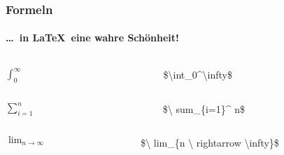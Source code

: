 
\begin{frame}
\frametitle{Formeln}
\framesubtitle{\ldots ~in \LaTeX ~eine wahre Sch\"onheit!}
\begin{columns}
\begin{column}{.4\textwidth}
\flushright
$\int_0^\infty$
\end{column}
\begin{column}{.6\textwidth}
\flushleft
{\ttfamily\color{unibayellowI}\$\color{nounibaredI}\textbackslash\color{nounibaredI}int\_\color{black}0\color{nounibaredI}\textasciicircum \textbackslash infty\color{unibayellowI}\$}
\end{column}
\end{columns}
\begin{columns}
\begin{column}{.4\textwidth}
\flushright
$\sum_{i=1}^n$
\end{column}
\begin{column}{.6\textwidth}
\flushleft
{\ttfamily \color{unibayellowI}\$\color{nounibaredI}\textbackslash
\color{nounibaredI}sum\_\color{black}\{i=1\}\color{nounibaredI}\textasciicircum
\color{black}n\color{unibayellowI}\$}
\end{column}
\end{columns}

\begin{columns}
\begin{column}{.4\textwidth}
\flushright
$\lim_{n \rightarrow \infty}$
\end{column}
\begin{column}{.6\textwidth}
\flushleft
{\ttfamily \color{unibayellowI}\$\color{nounibaredI}\textbackslash
\color{nounibaredI}lim\_\color{black}\{n \color{nounibaredI}\textbackslash
\color{nounibaredI}rightarrow \color{nounibaredI}\textbackslash infty\color{black}\}\color{unibayellowI}\$}
\end{column}
\end{columns}


\end{frame}

